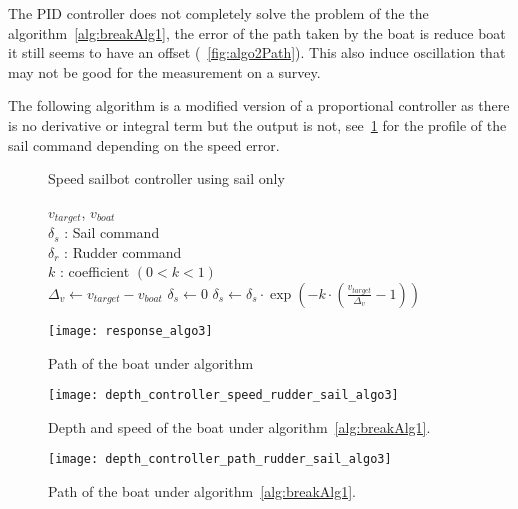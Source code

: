 The PID controller does not completely solve the problem of the the algorithm~\ref{alg:breakAlg1}, the error of the path taken by the boat is reduce boat  it still seems to have an offset (~\ref{fig:algo2Path}). This also induce oscillation that may not be good for the measurement on a survey.

The following algorithm is a modified version of a proportional controller as there is no derivative or integral term but the output is not, see~\ref{fig:responAlgo3} for the profile of the sail command depending on the speed error.

\begin{figure}[H]
\centering
    \begin{minipage}[b]{0.4\textwidth}
    \begin{algorithm}[H]
\caption{Speed sailbot controller using sail only}
\label{alg:breakAlg3}
\begin{algorithmic}[1]
\REQUIRE $v_{target}$, $v_{boat}$\\
   $\delta_s$ : Sail command\\
   $\delta_r$ : Rudder command\\
   $k$ : coefficient $(0< k <1)$\\
\STATE $\Delta_{v} \leftarrow v_{target} - v_{boat}$
\STATE $\delta_s \leftarrow 0$
\ELSE
\STATE $\delta_s \leftarrow \delta_s \cdot  \exp(-k \cdot (\frac{v_{target}}{\Delta_v}-1)) $
\ENDIF
\end{algorithmic}
\end{algorithm}
    \end{minipage}
    \hfill
    \begin{minipage}[b]{0.45\textwidth}
    \centering
    \texttt{[image: response\_algo3]}
    \caption{Path of the boat under algorithm}
    \label{fig:responAlgo3}
    \end{minipage}
\end{figure}




\begin{figure}[H]
\centering
    \begin{minipage}[b]{0.4\textwidth}
    \centering
    \texttt{[image: depth\_controller\_speed\_rudder\_sail\_algo3]}
    \caption{Depth and speed of the boat under algorithm~\ref{alg:breakAlg1}.}
    \label{fig: algo3Depth}
    \end{minipage}
    \hfill
    \begin{minipage}[b]{0.45\textwidth}
    \centering
    \texttt{[image: depth\_controller\_path\_rudder\_sail\_algo3]}
    \caption{Path of the boat under algorithm~\ref{alg:breakAlg1}.}
    \label{fig:algo3Path}
    \end{minipage}
\end{figure}

